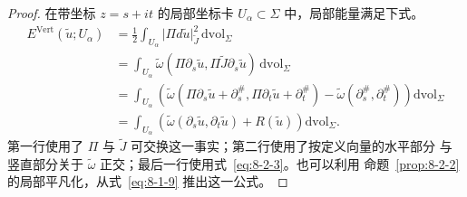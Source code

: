 \begin{proof}
在带坐标 $z=s+it$ 的局部坐标卡 $U_\alpha\subset\Sigma$ 中，局部能量满足下式。
\begin{align*}
  E^{\mathrm{Vert}}(\widetilde u;U_\alpha)
  &=\frac12\int_{U_\alpha}
    \lvert\Pi d\widetilde u\rvert_{\widetilde J}^2\,
    \mathrm{dvol}_\Sigma\\
  &=\int_{U_\alpha}
    \widetilde\omega(\Pi\partial_s\widetilde u,
                     \Pi\widetilde J\partial_s\widetilde u)
    \,\mathrm{dvol}_\Sigma\\
  &=\int_{U_\alpha}
    \left(
      \widetilde\omega(\Pi\partial_s\widetilde u+\partial_s^\#,
                       \Pi\partial_t\widetilde u+\partial_t^\#)
      -\widetilde\omega(\partial_s^\#,\partial_t^\#)
    \right)\mathrm{dvol}_\Sigma\\
  &=\int_{U_\alpha}
    \left(\widetilde\omega(\partial_s\widetilde u,
                            \partial_t\widetilde u)
          +R(\widetilde u)\right)\mathrm{dvol}_\Sigma.
\end{align*}
第一行使用了 $\Pi$ 与 $\widetilde J$ 可交换这一事实；第二行使用了按定义向量的水平部分
与竖直部分关于 $\widetilde\omega$ 正交；最后一行使用式~\eqref{eq:8-2-3}。也可以利用
命题~\ref{prop:8-2-2} 的局部平凡化，从式~\eqref{eq:8-1-9} 推出这一公式。
\end{proof}

